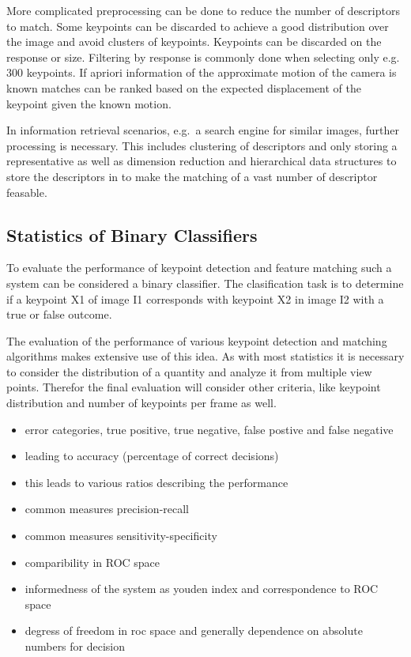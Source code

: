More complicated preprocessing can be done to reduce the number of descriptors to match.
Some keypoints can be discarded to achieve a good distribution over the image and avoid clusters of keypoints.
Keypoints can be discarded on the response or size.
Filtering by response is commonly done when selecting only e.g. 300 keypoints.
If apriori information of the approximate motion of the camera is known matches can be ranked based on the expected displacement of the keypoint given the known motion.

In information retrieval scenarios, e.g.~a search engine for similar images, further processing is necessary.
This includes clustering of descriptors and only storing a representative as well as dimension reduction and hierarchical data structures to store the descriptors in to make the matching of a vast number of descriptor feasable.

\subsection{Statistics of Binary Classifiers}

To evaluate the performance of keypoint detection and feature matching such a system can be considered a binary classifier.
The clasification task is to determine if a keypoint X1 of image I1 corresponds with keypoint X2 in image I2 with a true or false outcome.

The evaluation of the performance of various keypoint detection and matching algorithms makes extensive use of this idea.
As with most statistics it is necessary to consider the distribution of a quantity and analyze it from multiple view points.
Therefor the final evaluation will consider other criteria, like keypoint distribution and number of keypoints per frame as well.

\begin{itemize}
    \item error categories, true positive, true negative, false postive and false negative
    \item leading to accuracy (percentage of correct decisions)
    \item this leads to various ratios describing the performance 
    \item common measures precision-recall
    \item common measures sensitivity-specificity
    \item comparibility in ROC space
    \item informedness of the system as youden index and correspondence to ROC space
    \item degress of freedom in roc space and generally dependence on absolute numbers for decision 
\end{itemize}

